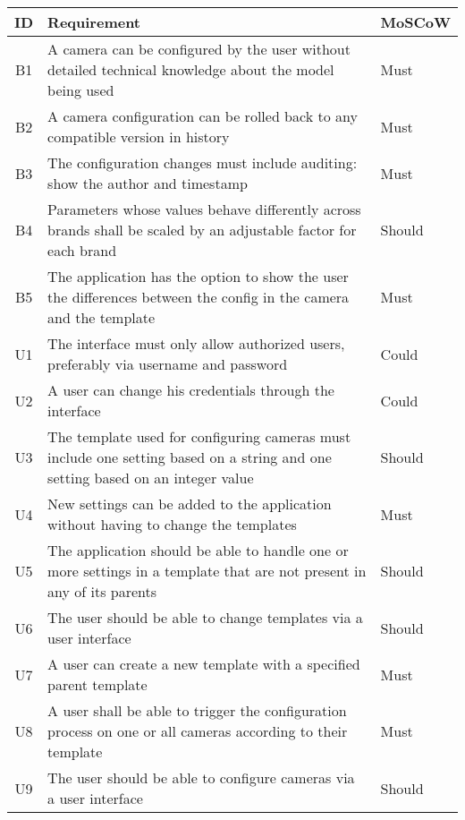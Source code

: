 \begin{table*}[h]
    \centering
    \begin{tabulary}{\linewidth}{CLL}
        \textbf{ID} & \textbf{Requirement} & \textbf{MoSCoW}
        \\ \hline %
        B1 & A camera can be configured by the user without detailed technical knowledge about the model being used & Must
        \\ \hline
        B2 & A camera configuration can be rolled back to any compatible version in history & Must
        \\ \hline
        B3 & The configuration changes must include auditing: show the author and timestamp & Must
        \\ \hline
        B4 & Parameters whose values behave differently across brands shall be scaled by an adjustable factor for each brand & Should
        \\ \hline
        B5 & The application has the option to show the user the differences between the config in the camera and the template & Must
        \\ \hline
        U1 & The interface must only allow authorized users, preferably via username and password & Could
        \\ \hline
        U2 & A user can change his credentials through the interface & Could
        \\ \hline
        U3 & The template used for configuring cameras must include one setting based on a string and one setting based on an integer value & Should
        \\ \hline
        U4 & New settings can be added to the application without having to change the templates & Must
        \\ \hline
        U5 & The application should be able to handle one or more settings in a template that are not present in any of its parents & Should
        \\ \hline
        U6 & The user should be able to change templates via a user interface & Should
        \\ \hline
        U7 & A user can create a new template with a specified parent template & Must
        \\ \hline
		U8 & A user shall be able to trigger the configuration process on one or all cameras according to their template & Must
		\\ \hline
		U9 & The user should be able to configure cameras via a user interface & Should

\end{tabulary}
\end{table*}
